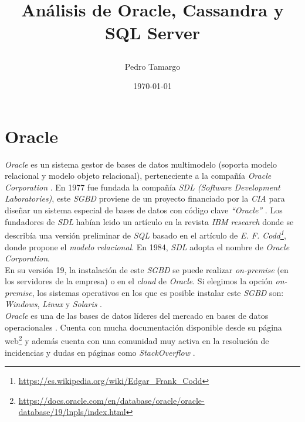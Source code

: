 \documentclass[11pt,a4paper]{article}
\begin{document}
\begin{titlepage}
\title{
\begin{Huge}
\textbf{Análisis de Oracle, Cassandra y SQL Server}
\end{Huge}
}
\author{Pedro Tamargo}
\date{\today}
\maketitle
\tableofcontents

\end{titlepage}


\newpage

\section{Oracle}

\emph{Oracle} es un sistema gestor de bases de datos multimodelo (soporta modelo relacional y modelo objeto relacional), perteneciente a la compañía \emph{Oracle Corporation} \cite{WIKI:1} . En 1977 fue fundada la compañía \emph{SDL (Software Development Laboratories)}, este \emph{SGBD} proviene de un proyecto financiado por la \emph{CIA} para diseñar un sistema especial de bases de datos con código clave \emph{``Oracle''} \cite{WIKI:2}. Los fundadores de \emph{SDL} habían leido un artículo en la revista \emph{IBM research} donde se describía una versión preliminar de \emph{SQL} basado en el artículo de \emph{E. F. Codd\footnote{\url{https://es.wikipedia.org/wiki/Edgar_Frank_Codd}}}, donde propone el \emph{modelo relacional}. En 1984, \emph{SDL} adopta el nombre de \emph{Oracle Corporation}.\\

En su versión 19, la instalación de este \emph{SGBD} se puede realizar \emph{on-premise} (en los servidores de la empresa) o en el \emph{cloud} de \emph{Oracle}. Si elegimos la opción \emph{on-premise}, los sistemas operativos en los que es posible instalar este \emph{SGBD} son: \emph{Windows}, \emph{Linux} y \emph{Solaris} \cite{ORA:1}.\\

\emph{Oracle} es una de las bases de datos líderes del mercado en bases de datos operacionales \cite{GART:1}. Cuenta con mucha documentación disponible desde su página web\footnote{\url{https://docs.oracle.com/en/database/oracle/oracle-database/19/lnpls/index.html}} y además cuenta con una comunidad muy activa en la resolución de incidencias y dudas en páginas como \emph{StackOverflow} \cite{STO:1}.\\
\end{document}

